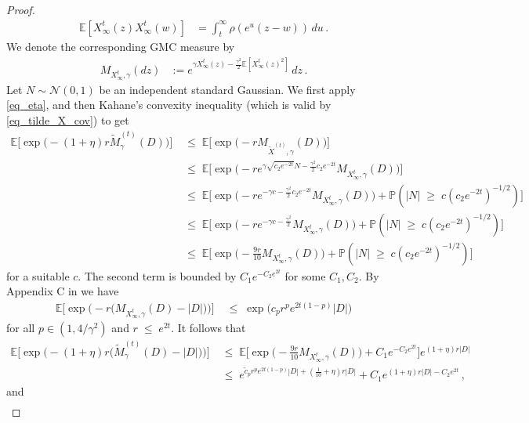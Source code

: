 \documentclass[11pt]{article}
\numberwithin{equation}{section}
\theoremstyle{definition}
\renewcommand{\tilde}{\widetilde}          %
\renewcommand{\leq}{\;\leqslant\;}                   %
\renewcommand{\geq}{\;\geqslant\;}                   %
\newcommand{\E}{\mathbb{E}}
\renewcommand{\P}{\mathbb{P}}
\newcommand{\ab}{|}
\newcommand{\Pb}{\P}
\begin{document}
\begin{proof}
\begin{align*}
\E[X_\infty^t(z) X_\infty^t(w)] &= \int_t^\infty \rho(e^u (z-w) ) \, du\,.
\end{align*}
We denote the corresponding GMC measure by
\begin{align*}
M_{X_\infty^t,\gamma} (dz) &:= e^{\gamma X_\infty^t(z) - \frac{\gamma^2}{2} \E[ X_\infty^t(z)^2] } \, dz \,.
\end{align*}
Let $N \sim \mathcal{N}(0,1)$ be an independent standard Gaussian. We first apply \eqref{eq_eta}, and then Kahane's convexity inequality (which is valid by \eqref{eq_tilde_X_cov}) to get
\begin{align*}
\E \big[ \exp \big(- (1+\eta) r \tilde M^{(t)}_{\gamma}(D) \big)\big] & \leq \E \big[ \exp \big(- r  M_{\tilde X^{(t)},\gamma}(D) \big)\big] \\
& \leq \E \big[ \exp \big(-r e^{\gamma \sqrt{c_2  e^{-2t}} N - \frac{\gamma^2}{2}c_2  e^{-2t}} M_{X_\infty^t,\gamma}(D) \big)\big] \\
& \leq \E \big[ \exp \big(-r  e^{-\gamma c- \frac{\gamma^2}{2}c_2  e^{-2t}} M_{X_\infty^t,\gamma}(D) \big) + \Pb(\ab N \ab \geq c (c_2  e^{-2t})^{-1/2}) \big] \\
& \leq \E \big[ \exp \big(-r   e^{-\gamma c - \frac{\gamma^2}{2} } M_{X_\infty^t,\gamma}(D) \big) + \Pb(\ab N \ab \geq c (c_2  e^{-2t})^{-1/2}) \big] \\
& \leq \E \big[ \exp \big(- \tfrac{9r }{10}  M_{X_\infty^t,\gamma}(D) \big) + \Pb(\ab N \ab \geq c (c_2  e^{-2t})^{-1/2}) \big]
\end{align*}
for a suitable $c$. The second term is bounded by $C_1 e ^{-C_2 e^{2t}}$ for some $C_1, C_2$. By Appendix C in \cite{LRV} we have 
\begin{align*}
\E  \big[ \exp \big(- r  \big( M_{X_\infty^t,\gamma}(D) - \ab D \ab \big) \big) \big] & \leq \exp \big( c_p r^p e^{2t(1-p)} \ab D \ab  \big)
\end{align*}
for all $p \in (1,4/\gamma^2)$ and $r \leq e^{2t}$. It follows that 
\begin{align*}
\E \big[ \exp \big(- (1+\eta)r  \big( \tilde M^{(t)}_{\gamma}(D) - \ab D \ab \big) \big) \big] & \leq  \E \big[ \exp \big(- \tfrac{9r}{10} M_{X_\infty^t,\gamma}(D) \big) + C_1 e^{-C_2 e^{2t}} \big]   e^{(1+\eta)r \ab D \ab }  \\
& \leq e^{\tilde c_p r^p e^{2t(1-p)} |D| + (\frac{1}{10} + \eta)r \ab D \ab     } + C_1 e^{(1+\eta)r \ab D \ab - C_2 e^{2t}}\,,
\end{align*}
and
\begin{align*}

\end{align*}
\end{proof}
\end{document}
